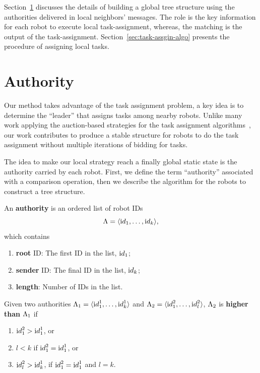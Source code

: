 Section~\ref{sec:auth} discusses the details of building a global tree structure using the authorities delivered in local neighbors' messages.
% 
The role is the key information for each robot to execute local task-assignment,
%
whereas, the matching is the output of the task-assignment.
%
Section~\ref{sec:task-assgin-algo} presents the procedure of assigning local tasks.

\section{Authority}
\label{sec:auth}

Our method takes advantage of the task assignment problem, a key idea
is to determine the ``leader'' that assigns tasks among nearby robots. 
%
Unlike many work applying the auction-based strategies for the task assignment algorithms~\cite{Ber88, FarIocNarZip06, ZavSpePap08, MicZavKumPap08, ChoBruHow09, ChaHenIAS13, LiuShe13}, 
our work contributes to produce a stable structure for robots to do the 
task assignment without multiple iterations of bidding for tasks.


The idea to make our local strategy reach a finally global static state is the authority carried by each robot.  
%
First, we define the term ``authority'' associated with a comparison operation, then we describe the algorithm for the robots to construct a tree structure.

\begin{defn}
  An \textbf{authority} is an ordered list of robot IDs
    $$\Lambda = \langle {\textrm id}_1, \ldots, {\textrm id}_k \rangle,$$
   which contains
    \begin{enumerate}
    \item \textbf{root} ID: The first ID in the list, ${\textrm id}_1$;
    \item \textbf{sender} ID: The final ID in the list, ${\textrm id}_k$;
    \item \textbf{length}: Number of IDs in the list.
    \end{enumerate}
\end{defn}

\begin{defn}
  Given two authorities
    $\Lambda_1=\langle {\textrm id}_1^1, \ldots, {\textrm id}_k^1\rangle$
  and
    $\Lambda_2=\langle {\textrm id}_1^2, \ldots, {\textrm id}_l^2\rangle$,
  $\Lambda_2$ is \textbf{higher than} $\Lambda_1$ if 
  \begin{enumerate}
    \item ${\textrm id}_1^2 > {\textrm id}_1^1$, or
    \item $l < k$ if ${\textrm id}_1^2 = {\textrm id}_1^1$, or
    \item ${\textrm id}_l^2 > {\textrm id}_k^1$, if ${\textrm id}_1^2 = {\textrm id}_1^1$ and $l = k$.
  \end{enumerate}
\end{defn}


